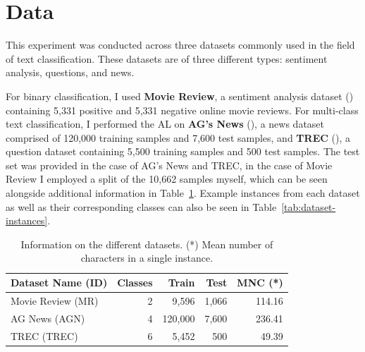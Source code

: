 \documentclass[english,bachelor,ul]{webisthesis} %
\begin{document}
\section{Data}

This experiment was conducted across three datasets commonly used in the field of text classification. These datasets are of three different types: sentiment analysis, questions, and news. 

For binary classification, I used \textbf{Movie Review}, a sentiment analysis dataset (\cite{DBLP:conf/acl/PangL05}) containing 5,331 positive and 5,331 negative online movie reviews. For multi-class text classification, I performed the AL on \textbf{AG's News} (\cite{DBLP:conf/nips/ZhangZL15}), a news dataset comprised of 120,000 training samples and 7,600 test samples, and \textbf{TREC} (\cite{DBLP:journals/nle/LiR06}), a question dataset containing 5,500 training samples and 500 test samples. The test set was provided in the case of AG's News and TREC, in the case of Movie Review I employed a split of the 10,662 samples myself, which can be seen alongside additional information in Table~\ref{tab:dataset-table}. Example instances from each dataset as well as their corresponding classes can also be seen in Table~\ref{tab:dataset-instances}.

\vspace{3\baselineskip}

\begin{table}[htpb]
    \centering
    \setlength{\tabcolsep}{16pt} %
    \begin{tabular}{@{}lrrrr@{}} %
        \toprule
        \bfseries Dataset Name \scriptsize (ID) & \bfseries Classes & \bfseries Train & \bfseries Test & \bfseries MNC (*) \\
        \midrule
        Movie Review \scriptsize (MR) & 2 & 9,596 & 1,066 & 114.16 \\
        AG News \scriptsize (AGN) & 4 & 120,000 & 7,600 &  236.41 \\
        TREC \scriptsize (TREC) & 6 & 5,452 & 500 & 49.39 \\
        \bottomrule
    \end{tabular}
    \caption{Information on the different datasets. (*) Mean number of characters in a single instance.}
  \label{tab:dataset-table}%
\end{table}
\end{document}
